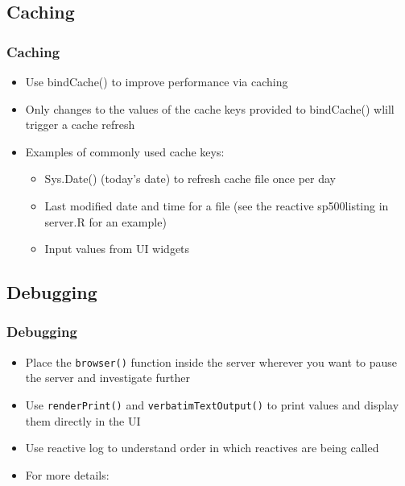 \documentclass[
	11pt, %
]{beamer}
\begin{document}
\subsection{Caching}

\begin{frame}
	\frametitle{Caching}
	
	\begin{itemize}
		\item Use bindCache() to improve performance via caching
		\item Only changes to the values of the cache keys provided to bindCache() wlill trigger a cache refresh
		\item Examples of commonly used cache keys:
	\begin{itemize}
		\item Sys.Date() (today's date) to refresh cache file once per day
		\item Last modified date and time for a file (see the reactive sp500listing in server.R for an example)
		\item Input values from UI widgets
	\end{itemize}
	\end{itemize}
\end{frame}



\subsection{Debugging}

\begin{frame}
	\frametitle{Debugging}
	
	\begin{itemize}
	\item Place the \texttt{browser()} function inside the server wherever you want to pause the server and investigate further
	\item Use \texttt{renderPrint()} and \texttt{verbatimTextOutput()} to print values and display them directly in the UI
	\item Use reactive log to understand order in which reactives are being called
	\item For more details: \href{https://shiny.posit.co/r/articles/improve/debugging/}{\color{blue}{https://shiny.posit.co/r/articles/improve/debugging/}} 

	\end{itemize}
	
\end{frame}
\end{document}
